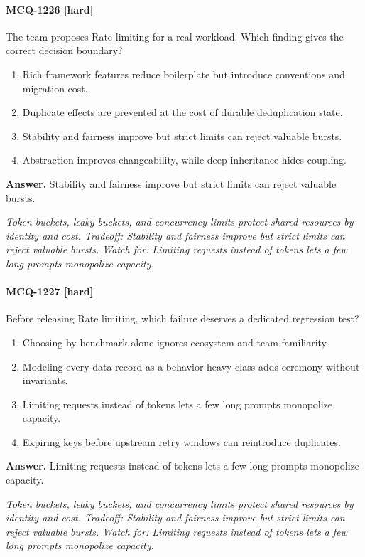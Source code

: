 \paragraph{MCQ-1226 [hard]} The team proposes Rate limiting for a real workload. Which finding gives the correct decision boundary?
\begin{enumerate}[label=\Alph*.]
\item Rich framework features reduce boilerplate but introduce conventions and migration cost.
\item Duplicate effects are prevented at the cost of durable deduplication state.
\item Stability and fairness improve but strict limits can reject valuable bursts.
\item Abstraction improves changeability, while deep inheritance hides coupling.
\end{enumerate}
\noindent\textbf{Answer.} Stability and fairness improve but strict limits can reject valuable bursts.
\par\textit{Token buckets, leaky buckets, and concurrency limits protect shared resources by identity and cost. Tradeoff: Stability and fairness improve but strict limits can reject valuable bursts. Watch for: Limiting requests instead of tokens lets a few long prompts monopolize capacity.}
\paragraph{MCQ-1227 [hard]} Before releasing Rate limiting, which failure deserves a dedicated regression test?
\begin{enumerate}[label=\Alph*.]
\item Choosing by benchmark alone ignores ecosystem and team familiarity.
\item Modeling every data record as a behavior-heavy class adds ceremony without invariants.
\item Limiting requests instead of tokens lets a few long prompts monopolize capacity.
\item Expiring keys before upstream retry windows can reintroduce duplicates.
\end{enumerate}
\noindent\textbf{Answer.} Limiting requests instead of tokens lets a few long prompts monopolize capacity.
\par\textit{Token buckets, leaky buckets, and concurrency limits protect shared resources by identity and cost. Tradeoff: Stability and fairness improve but strict limits can reject valuable bursts. Watch for: Limiting requests instead of tokens lets a few long prompts monopolize capacity.}
